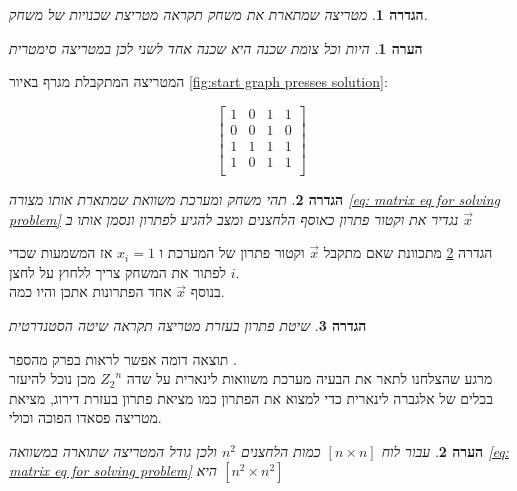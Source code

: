\documentclass[12pt,twoside]{article}
\newtheorem{definition}{הגדרה}[section]
\newtheorem{comm}{הערה}[section]
\newcommand{\Zn}{{Z_2}^n}
\begin{document}
\begin{definition}
    \label{def: neighbor matrix}
    מטריצה שמתארת את משחק תקראה מטריצת שכנויות של משחק.
\end{definition}


\begin{comm}
    \label{comm: symetic matrix}
    היות וכל צומת שכנה היא שכנה אחד לשני לכן במטריצה
    סימטרית
\end{comm}

המטריצה  המתקבלת מגרף באיור 
\ref{fig:start graph presses solution}:

\[
    \begin{bmatrix}
        1 & 0 & 1 & 1\\
        0 & 0 & 1 & 0\\
        1 & 1 & 1 & 1\\
        1 & 0 & 1 & 1\\
    \end{bmatrix}
\]


\begin{definition}
    \label{ def: solution vector}
    תהי משחק ומערכת משוואת שמתארת אותו מצורה 
    \ref{eq: matrix eq for solving problem} 
    נגדיר את וקטור פתרון כאוסף הלחצנים ומצב להגיע לפתרון
    ונסמן אותו ב
    $\vec{x}$
\end{definition}

הגדרה 
\ref{ def: solution vector}
מתכוונת שאם מתקבל
$\vec{x}$
וקטור פתרון של המערכת 
ו
$x_i = 1$
אז המשמעות שכדי לפתור את המשחק
צריך ללחוץ על לחצן 
$i$.
\\
בנוסף 
$\vec{x}$
אחד הפתרונות אתכן והיו כמה.

\begin{definition}
    \label{def: standard solution}
    שיטת פתרון בעזרת מטריצה תקראה שיטה הסטנדרטית
\end{definition}



תוצאה דומה אפשר לראות בפרק מהספר
\cite{B2}.
\\
מרגע שהצלחנו לתאר את הבעיה מערכת משוואות לינארית
על שדה
$\Zn$
מכן נוכל להיעזר בכלים של אלגברה לינארית כדי למצוא את הפתרון כמו מציאת פתרון בעזרת דירוג,
מציאת מטריצה פסאדו הפוכה וכולי.

\begin{comm}
    \label{comm: for board too many variables}
    עבור לוח 
$[n \times n]$
כמות הלחצנים 
$n^2$
ולכן גודל המטריצה שתוארה במשוואה
\ref{eq: matrix eq for solving problem}
היא 
$[n^2 \times n^2]$
\end{comm}
\end{document}
